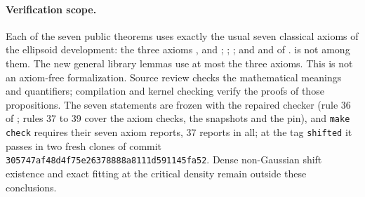 \documentclass[11pt]{article}
\theoremstyle{remark}
\begin{document}
\paragraph{Verification scope.}
Each of the seven public theorems uses exactly the usual seven
classical axioms of the ellipsoid development: the three 
axioms ,
 and
;
;
; and  and
 of .
 is not among them. The new general library
lemmas use at most the three  axioms. This is not an
axiom-free formalization.
Source review checks the mathematical meanings and quantifiers;
compilation and kernel checking verify the proofs of those propositions.
The seven statements are frozen with the repaired checker (rule 36 of
; rules 37 to 39 cover the axiom
checks, the snapshots and the pin), and \texttt{make check} requires
their seven axiom reports, 37 reports in all; at the tag
\texttt{shifted} it passes in two fresh clones of commit
\texttt{305747af48d4f75e26378888a8111d591145fa52}. Dense non-Gaussian
shift existence and exact fitting at the critical density remain outside
these conclusions.
\par\endgroup



\end{document}
